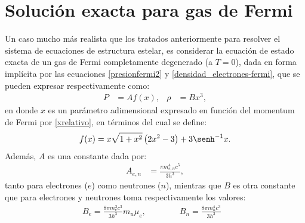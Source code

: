 \section{Solución exacta para gas de Fermi}\label{sec:fermi-exacta}

Un caso mucho más realista que los tratados anteriormente para resolver el sistema de ecuaciones de estructura estelar, es considerar la ecuación de estado exacta de un gas de Fermi completamente degenerado (a $T=0$), dada en forma implícita por las ecuaciones \eqref{presionfermi2} y \eqref{densidad_electrones-fermi}, que se pueden expresar respectivamente como:
\begin{align}\label{ec-estado-fermi}
 P&=Af(x),&\rho&=Bx^3,
\end{align}
en donde $x$ es un parámetro adimensional expresado en función del momentum de Fermi por \eqref{xrelativo}, en términos del cual se define:
\begin{equation}\label{ec-fermi-fx}
 f(x)=x\sqrt{1+x^2}\left(2x^2-3\right)+3\senh^{-1}x.
\end{equation}
Además, $A$ es una constante dada por:
\begin{align}\label{ec-fermi-A}
 A_{e,n}&=\frac{\pi m_{e,n}^4 c^5}{3 h^3},
\end{align}
tanto para electrones ($e$) como neutrones ($n$), mientras que $B$ es otra constante que para electrones y neutrones toma respectivamente los valores:
\begin{align}\label{ec-fermi-B}
B_e=\frac{8\pi m_e^3 c^3}{3h^3}m_u\mu_e,\qquad\qquad B_n=\frac{8\pi m_n^4 c^3}{3h^3}&
\end{align}

